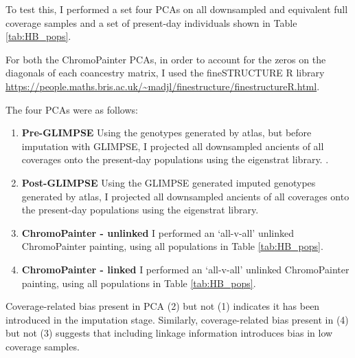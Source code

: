 {To test this, I performed a set four PCAs on all downsampled and equivalent full coverage samples and a set of present-day individuals shown in Table \ref{tab:HB_pops}.

For both the ChromoPainter PCAs, in order to account for the zeros on the diagonals of each coancestry matrix, I used the fineSTRUCTURE R library \url{https://people.maths.bris.ac.uk/~madjl/finestructure/finestructureR.html}.

The four PCAs were as follows:

\begin{enumerate}
\item \textbf{Pre-GLIMPSE} Using the genotypes generated by atlas, but before imputation with GLIMPSE, I projected all downsampled ancients of all coverages onto the present-day populations using the eigenstrat library. \cite{Price2006}.
\item \textbf{Post-GLIMPSE} Using the GLIMPSE generated imputed genotypes generated by atlas, I projected all downsampled ancients of all coverages onto the present-day populations using the eigenstrat library.
\item \textbf{ChromoPainter - unlinked} I performed an `all-v-all' unlinked ChromoPainter painting, using all populations in Table \ref{tab:HB_pops}. 
\item \textbf{ChromoPainter - linked} I performed an `all-v-all' unlinked ChromoPainter painting, using all populations in Table \ref{tab:HB_pops}.
\end{enumerate}

Coverage-related bias present in PCA (2) but not (1) indicates it has been introduced in the imputation stage. Similarly, coverage-related bias present in (4) but not (3) suggests that including linkage information introduces bias in low coverage samples. 


}
